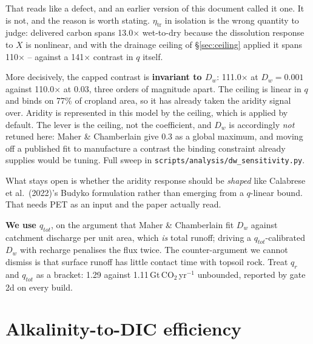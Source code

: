 \documentclass[11pt,a4paper]{article}
\newcommand{\cotwo}{\ensuremath{\mathrm{CO_2}}}
\begin{document}
That reads like a defect, and an earlier version of this document called it one.
It is not, and the reason is worth stating. $\eta_{\mathrm{tr}}$ in isolation is
the wrong quantity to judge: delivered carbon spans 13.0$\times$ wet-to-dry
because the dissolution response to $X$ is nonlinear, and with the drainage ceiling
of \S\ref{sec:ceiling} applied it spans 110$\times$ -- against a
141$\times$ contrast in $q$ itself.

More decisively, the capped contrast is \textbf{invariant to $D_w$}:
111.0$\times$ at $D_w = 0.001$ against 110.0$\times$ at
0.03, three orders of magnitude apart. The ceiling is linear in
$q$ and binds on 77\% of cropland area, so it has already taken the
aridity signal over. Aridity is represented in this model by the ceiling, which
is applied by default. The lever is the ceiling, not the coefficient, and
$D_w$ is accordingly \emph{not} retuned here: Maher \& Chamberlain give 0.3 as a
global maximum, and moving off a published fit to manufacture a contrast the
binding constraint already supplies would be tuning. Full sweep in
\texttt{scripts/analysis/dw\_sensitivity.py}.

What stays open is whether the aridity response should be \emph{shaped} like
Calabrese et al.\ (2022)'s Budyko formulation rather than emerging from a
$q$-linear bound. That needs PET as an input and the paper actually read.

\textbf{We use $q_{tot}$}, on the argument that Maher \& Chamberlain fit $D_w$
against catchment discharge per unit area, which \emph{is} total runoff; driving a
$q_{tot}$-calibrated $D_w$ with recharge penalises the flux twice. The
counter-argument we cannot dismiss is that surface runoff has little contact time
with topsoil rock. Treat $q_r$ and $q_{tot}$ as a bracket: 1.29 against
1.11\,Gt\,\cotwo{}\,yr$^{-1}$ unbounded, reported by gate 2d on every
build.

\section{Alkalinity-to-DIC efficiency}
\label{sec:dic}
\end{document}
